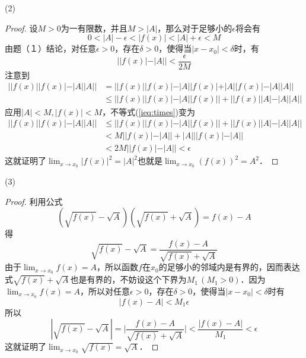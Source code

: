 \noindent (2)
\begin{proof}
设$M>0$为一有限数，并且$M>|A|$，那么对于足够小的$\epsilon$将会有
\begin{equation}
0 < |A| - \epsilon < |f(x)| < |A| + \epsilon < M
\end{equation}
由题（１）结论，对任意$\epsilon > 0$，存在$\delta > 0$，使得当$|x - x_0| < \delta$时，有
\begin{equation}
    ||f(x)|-|A||<\frac{\epsilon}{2M}
\end{equation}
注意到
\begin{align}
    ||f(x)||f(x)|-|A||A|| &= ||f(x)||f(x)| - |A||f(x)| + |A||f(x)| - |A||A|| \\
    &\leq ||f(x)||f(x)| - |A||f(x)|| + ||f(x)||A|-|A||A|| \label{ieq:times}
\end{align}
应用$|A| < M, |f(x)| < M$，不等式(\ref{ieq:times})变为
\begin{align}
    ||f(x)||f(x)|-|A||A|| &\leq ||f(x)||f(x)| - |A||f(x)|| + ||f(x)||A|-|A||A|| \\
    &< M||f(x)|-|A|| + |A|||f(x)|-|A|| \\
    &<2M||f(x)|-|A|| < \epsilon
\end{align}
这就证明了$\displaystyle\lim_{x \to x_0} |f(x)|^2 = |A|^2$也就是$\displaystyle\lim_{x \to x_0} (f(x))^2 = A^2$．
\end{proof}

\noindent (3)
\begin{proof}
利用公式
\begin{equation}
    (\sqrt{f(x)}-\sqrt{A})(\sqrt{f(x)}+\sqrt{A})=f(x)-A
\end{equation}
得
\begin{equation}
    \sqrt{f(x)}-\sqrt{A} = \frac{f(x)-A}{\sqrt{f(x)}+\sqrt{A}}
\end{equation}
由于$\displaystyle\lim_{x \to x_0} f(x) = A$，所以函数$f$在$x_0$的足够小的邻域内是有界的，因而表达式$\sqrt{f(x)}+\sqrt{A}$也是有界的，不妨设这个下界为$M_1 \, (M_1 > 0)$．因为$\displaystyle\lim_{x \to x_0} f(x) = A$，所以对任意$\epsilon > 0$，存在$\delta > 0$，使得当$|x - x_0| < \delta$时有
\begin{equation}
    |f(x)-A|<M_1\epsilon
\end{equation}
所以
\begin{equation}
    |\sqrt{f(x)}-\sqrt{A}|=\bigg\lvert \frac{f(x)-A}{\sqrt{f(x)}+\sqrt{A}} \bigg\rvert < \frac{|f(x)-A|}{M_1} < \epsilon
\end{equation}
这就证明了$\displaystyle\lim_{x \to x_0} \sqrt{f(x)} = \sqrt{A}$．
\end{proof}

